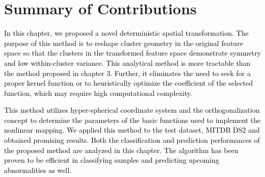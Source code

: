 \section{Summary of Contributions}

\textcolor{black}{In this chapter, we proposed a novel deterministic spatial transformation. The purpose of this method is to reshape cluster geometry in the original feature space so that the clusters in the transformed feature space demonstrate symmetry and low within-cluster variance. This analytical method is more tractable than the method proposed in chapter 3. Further, it eliminates the need to seek for a proper kernel function or to heuristically optimize the coefficient of the selected function, which may require high computational complexity.}

\textcolor{black}{This method utilizes hyper-spherical coordinate system and the orthogonalization concept to determine the parameters of the basic functions used to implement the nonlinear mapping. We applied this method to the test dataset, MITDB DS2 and obtained promising results. Both the classification and prediction performances of the proposed method are analyzed in this chapter. The algorithm has been proven to be efficient in classifying samples and predicting upcoming abnormalities as well. }
